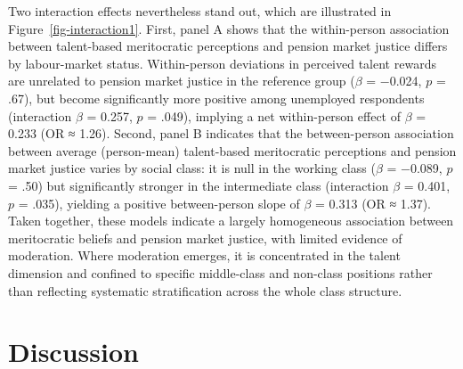 \documentclass[
  12pt,
]{article}
\begin{document}
Two interaction effects nevertheless stand out, which are illustrated in
Figure~\ref{fig-interaction1}. First, panel A shows that the
within-person association between talent-based meritocratic perceptions
and pension market justice differs by labour-market status.
Within-person deviations in perceived talent rewards are unrelated to
pension market justice in the reference group (\(\beta\) = −0.024, \(p\)
= .67), but become significantly more positive among unemployed
respondents (interaction \(\beta\) = 0.257, \(p\) = .049), implying a
net within-person effect of \(\beta\) = 0.233 (OR ≈ 1.26). Second, panel
B indicates that the between-person association between average
(person-mean) talent-based meritocratic perceptions and pension market
justice varies by social class: it is null in the working class
(\(\beta\) = −0.089, \(p\) = .50) but significantly stronger in the
intermediate class (interaction \(\beta\) = 0.401, \(p\) = .035),
yielding a positive between-person slope of \(\beta\) = 0.313 (OR ≈
1.37). Taken together, these models indicate a largely homogeneous
association between meritocratic beliefs and pension market justice,
with limited evidence of moderation. Where moderation emerges, it is
concentrated in the talent dimension and confined to specific
middle-class and non-class positions rather than reflecting systematic
stratification across the whole class structure.

\section{Discussion}\label{discussion}
\end{document}
